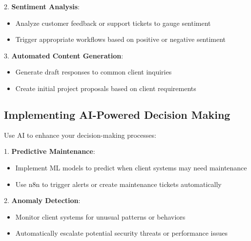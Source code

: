 2. \textbf{Sentiment Analysis}:
\begin{itemize}
    \item Analyze customer feedback or support tickets to gauge sentiment
    \item Trigger appropriate workflows based on positive or negative sentiment
\end{itemize}


3. \textbf{Automated Content Generation}:
\begin{itemize}
    \item Generate draft responses to common client inquiries
    \item Create initial project proposals based on client requirements
\end{itemize}


\subsection{Implementing AI-Powered Decision Making}

Use AI to enhance your decision-making processes:

1. \textbf{Predictive Maintenance}:
\begin{itemize}
    \item Implement ML models to predict when client systems may need maintenance
    \item Use n8n to trigger alerts or create maintenance tickets automatically
\end{itemize}

2. \textbf{Anomaly Detection}:
\begin{itemize}
    \item Monitor client systems for unusual patterns or behaviors
    \item Automatically escalate potential security threats or performance issues
\end{itemize}

